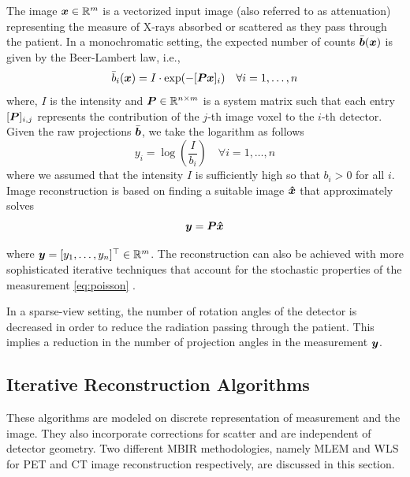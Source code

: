 The image $\bm{x}\in\mathbb{R}^m$ is a vectorized input image (also referred to as attenuation) representing the measure of X-rays absorbed or scattered as they pass through the patient. In a monochromatic setting, the expected number of counts $\bar{\bm{b}}(\bm{x})$  is given by the Beer-Lambert law, i.e.,
\begin{equation}\label{eq:CT}
\bar{b}_i(\bm{x}) = I \cdot \exp (-[\bm{P} \bm{x}]_i) \quad \forall i=1,\dots,n 
\end{equation}
where, $I$ is the intensity and $\bm{P} \in \mathbb{R}^{n\times m}$ is a system matrix such that each entry $[\bm{P}]_{i,j}$ represents the contribution of the $j$-th image voxel to the $i$-th detector. Given the raw projections $\bar{\bm{b}}$, we take the logarithm as follows
\begin{equation}
y_i = \log\left(\frac{I}{b_i}\right) \quad \forall i=1,\dots,n   
\end{equation}
where we assumed that the intensity $I$ is sufficiently high so that $b_i>0$ for all $i$. Image reconstruction is based on finding a suitable image $\bm{\hat{x}}$ that approximately solves 
\begin{equation}\label{eq:pb2solve}
\bm{y} = \bm{P} \bm{\hat{x}} 
\end{equation} 
 
where $\bm{y}  =  [y_1,\dots,y_n]^\top\in \mathbb{R}^m$. The reconstruction can also be achieved with more sophisticated iterative techniques that account for the stochastic properties of the measurement \eqref{eq:poisson} \cite{nuyts1998iterative,Elbakri2002}.

In a sparse-view setting, the number of rotation angles of the detector is decreased in order to reduce the radiation passing through the patient. This implies a reduction in the number of projection angles in the measurement $\bm{y}$.



 
\subsection{Iterative Reconstruction Algorithms}

These algorithms are modeled on discrete representation of measurement and the image. They also incorporate corrections for scatter and are independent of detector geometry. Two different \ac{MBIR} methodologies, namely \ac{MLEM} and \ac{WLS} for \ac{PET} and \ac{CT} image reconstruction respectively, are discussed in this section. 


